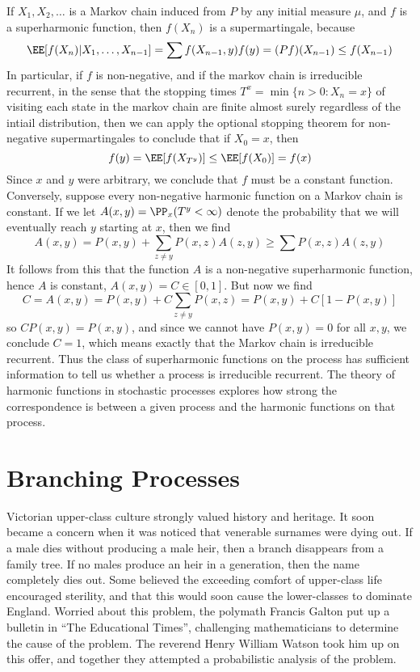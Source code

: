 If $X_1, X_2, \dots$ is a Markov chain induced from $P$ by any initial measure $\mu$, and $f$ is a superharmonic function, then $f(X_n)$ is a supermartingale, because
%
\[ \EE[f(X_n)|X_1, \dots, X_{n-1}] = \sum f(X_{n-1},y) f(y) = (Pf)(X_{n-1}) \leq f(X_{n-1}) \]
%
In particular, if $f$ is non-negative, and if the markov chain is irreducible recurrent, in the sense that the stopping times $T^x = \min \{ n > 0: X_n = x \}$ of visiting each state in the markov chain are finite almost surely regardless of the intiail distribution, then we can apply the optional stopping theorem for non-negative supermartingales to conclude that if $X_0 = x$, then
%
\[ f(y) = \EE[f(X_{T^y})] \leq \EE[f(X_0)] = f(x) \]
%
Since $x$ and $y$ were arbitrary, we conclude that $f$ must be a constant function. Conversely, suppose every non-negative harmonic function on a Markov chain is constant. If we let $A(x,y) = \PP_x(T^y < \infty)$ denote the probability that we will eventually reach $y$ starting at $x$, then we find
%
\[ A(x,y) = P(x,y) + \sum_{z \neq y} P(x,z) A(z,y) \geq \sum P(x,z) A(z,y) \]
%
It follows from this that the function $A$ is a non-negative superharmonic function, hence $A$ is constant, $A(x,y) = C \in [0,1]$. But now we find
%
\[ C = A(x,y) = P(x,y) + C \sum_{z \neq y} P(x,z) = P(x,y) + C[1 - P(x,y)] \]
%
so $C P(x,y) = P(x,y)$, and since we cannot have $P(x,y) = 0$ for all $x,y$, we conclude $C = 1$, which means exactly that the Markov chain is irreducible recurrent. Thus the class of superharmonic functions on the process has sufficient information to tell us whether a process is irreducible recurrent. The theory of harmonic functions in stochastic processes explores how strong the correspondence is between a given process and the harmonic functions on that process.

\chapter{Branching Processes}

Victorian upper-class culture strongly valued history and heritage. It soon became a concern when it was noticed that venerable surnames were dying out. If a male dies without producing a male heir, then a branch disappears from a family tree. If no males produce an heir in a generation, then the name completely dies out. Some believed the exceeding comfort of upper-class life encouraged sterility, and that this would soon cause the lower-classes to dominate England. Worried about this problem, the polymath Francis Galton put up a bulletin in ``The Educational Times'', challenging mathematicians to determine the cause of the problem. The reverend Henry William Watson took him up on this offer, and together they attempted a probabilistic analysis of the problem.


